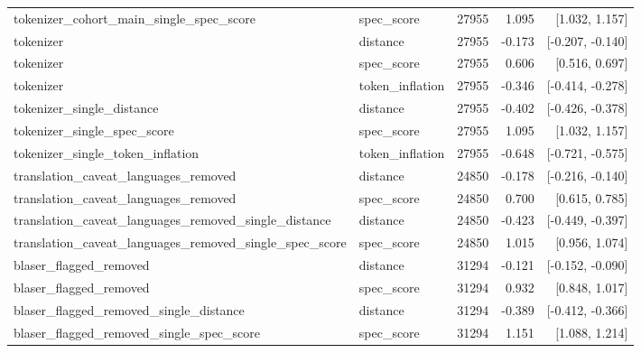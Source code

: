 \begin{longtable}{p{3.7cm}p{2.1cm}rrr}
tokenizer\_\allowbreak{}cohort\_\allowbreak{}main\_\allowbreak{}single\_\allowbreak{}spec\_\allowbreak{}score & spec\_\allowbreak{}score & 27955 & 1.095 & [1.032, 1.157]\\

tokenizer & distance & 27955 & -0.173 & [-0.207, -0.140]\\

tokenizer & spec\_\allowbreak{}score & 27955 & 0.606 & [0.516, 0.697]\\

tokenizer & token\_\allowbreak{}inflation & 27955 & -0.346 & [-0.414, -0.278]\\

tokenizer\_\allowbreak{}single\_\allowbreak{}distance & distance & 27955 & -0.402 & [-0.426, -0.378]\\

tokenizer\_\allowbreak{}single\_\allowbreak{}spec\_\allowbreak{}score & spec\_\allowbreak{}score & 27955 & 1.095 & [1.032, 1.157]\\

tokenizer\_\allowbreak{}single\_\allowbreak{}token\_\allowbreak{}inflation & token\_\allowbreak{}inflation & 27955 & -0.648 & [-0.721, -0.575]\\

translation\_\allowbreak{}caveat\_\allowbreak{}languages\_\allowbreak{}removed & distance & 24850 & -0.178 & [-0.216, -0.140]\\

translation\_\allowbreak{}caveat\_\allowbreak{}languages\_\allowbreak{}removed & spec\_\allowbreak{}score & 24850 & 0.700 & [0.615, 0.785]\\

translation\_\allowbreak{}caveat\_\allowbreak{}languages\_\allowbreak{}removed\_\allowbreak{}single\_\allowbreak{}distance & distance & 24850 & -0.423 & [-0.449, -0.397]\\

translation\_\allowbreak{}caveat\_\allowbreak{}languages\_\allowbreak{}removed\_\allowbreak{}single\_\allowbreak{}spec\_\allowbreak{}score & spec\_\allowbreak{}score & 24850 & 1.015 & [0.956, 1.074]\\

blaser\_\allowbreak{}flagged\_\allowbreak{}removed & distance & 31294 & -0.121 & [-0.152, -0.090]\\

blaser\_\allowbreak{}flagged\_\allowbreak{}removed & spec\_\allowbreak{}score & 31294 & 0.932 & [0.848, 1.017]\\

blaser\_\allowbreak{}flagged\_\allowbreak{}removed\_\allowbreak{}single\_\allowbreak{}distance & distance & 31294 & -0.389 & [-0.412, -0.366]\\

blaser\_\allowbreak{}flagged\_\allowbreak{}removed\_\allowbreak{}single\_\allowbreak{}spec\_\allowbreak{}score & spec\_\allowbreak{}score & 31294 & 1.151 & [1.088, 1.214]\\

\end{longtable}

